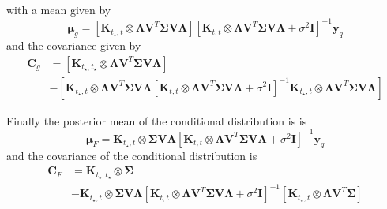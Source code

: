 with a mean given by
\begin{equation} \label{eq:prediction_MuG}
  \boldsymbol{\mu}_g = 
    \left[ \mathbf{K}_{t_\star,t} \otimes \boldsymbol{\Lambda} \mathbf{V}^T\boldsymbol{\Sigma} \mathbf{V} \boldsymbol{\Lambda}  \right] 
    \left[ \mathbf{K}_{t,t} \otimes \boldsymbol{\Lambda} \mathbf{V}^T\boldsymbol{\Sigma} \mathbf{V} \boldsymbol{\Lambda} + \sigma^2 \mathbf{I} \right]^{-1}\mathbf{y}_q
\end{equation}
and the covariance given by
\begin{equation} \label{eq:prediction_Cg}
\begin{split}
\boldsymbol{C}_g &= 
    \left[ \mathbf{K}_{t_\star,t_\star} \otimes \boldsymbol{\Lambda} \mathbf{V}^T\boldsymbol{\Sigma} \mathbf{V} \boldsymbol{\Lambda}  \right] \\
    & -\left[ \mathbf{K}_{t_\star,t} \otimes \boldsymbol{\Lambda} \mathbf{V}^T\boldsymbol{\Sigma} \mathbf{V} \boldsymbol{\Lambda}  
    \left[ \mathbf{K}_{t,t} \otimes \boldsymbol{\Lambda} \mathbf{V}^T\boldsymbol{\Sigma} \mathbf{V} \boldsymbol{\Lambda} + \sigma^2 \mathbf{I} \right]^{-1} 
    \mathbf{K}_{t_\star,t} \otimes \boldsymbol{\Lambda} \mathbf{V}^T\boldsymbol{\Sigma} \mathbf{V} \boldsymbol{\Lambda} \right]
\end{split}
\end{equation}

Finally the posterior mean of the conditional distribution  is %
is
\begin{equation} \label{eq:prediction_MuF}
  \boldsymbol{\mu}_F = 
    \mathbf{K}_{t_\star,t} \otimes \boldsymbol{\Sigma} \mathbf{V} \boldsymbol{\Lambda}
    \left[ \mathbf{K}_{t,t} \otimes \boldsymbol{\Lambda} \mathbf{V}^T\boldsymbol{\Sigma} \mathbf{V} \boldsymbol{\Lambda} + \sigma^2 \mathbf{I} \right]^{-1}\mathbf{y}_q
\end{equation}
and the covariance of the conditional distribution is %
\begin{equation} \label{eq:prediction_CF}
\begin{split}
  \boldsymbol{C}_F &= 
    \mathbf{K}_{t_\star,t_\star} \otimes \boldsymbol{\Sigma} \\
    & - \mathbf{K}_{t_\star,t} \otimes \boldsymbol{\Sigma}\mathbf{V} \boldsymbol{\Lambda}
    \left[ \mathbf{K}_{t,t} \otimes \boldsymbol{\Lambda} \mathbf{V}^T\boldsymbol{\Sigma} \mathbf{V} \boldsymbol{\Lambda} + \sigma^2 \mathbf{I} \right]^{-1} 
    \left[ \mathbf{K}_{t_\star,t} \otimes \boldsymbol{\Lambda} \mathbf{V}^T\boldsymbol{\Sigma}\right]
\end{split}
\end{equation}

